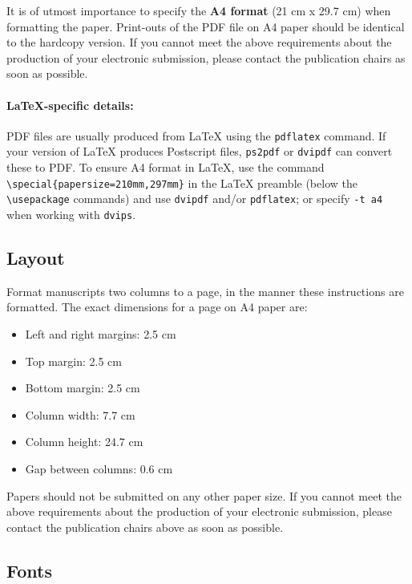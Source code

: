 \documentclass[11pt,a4paper]{article}
\begin{document}
It is of utmost importance to specify the \textbf{A4 format} (21 cm x 29.7 cm) when formatting the paper.
Print-outs of the PDF file on A4 paper should be identical to the hardcopy version.
If you cannot meet the above requirements about the production of your electronic submission, please contact the publication chairs as soon as possible.

\paragraph{\LaTeX-specific details:}
PDF files are usually produced from \LaTeX{} using the \texttt{\small pdflatex} command.
If your version of \LaTeX{} produces Postscript files, \texttt{\small ps2pdf} or \texttt{\small dvipdf} can convert these to PDF.
To ensure A4 format in \LaTeX, use the command {\small\verb|\special{papersize=210mm,297mm}|}
in the \LaTeX{} preamble (below the {\small\verb|\usepackage|} commands) and use \texttt{\small dvipdf} and/or \texttt{\small pdflatex}; or specify \texttt{\small -t a4} when working with \texttt{\small dvips}.

\subsection{Layout}
\label{ssec:layout}

Format manuscripts two columns to a page, in the manner these
instructions are formatted.
The exact dimensions for a page on A4 paper are:

\begin{itemize}
\item Left and right margins: 2.5 cm
\item Top margin: 2.5 cm
\item Bottom margin: 2.5 cm
\item Column width: 7.7 cm
\item Column height: 24.7 cm
\item Gap between columns: 0.6 cm
\end{itemize}

\noindent Papers should not be submitted on any other paper size.
If you cannot meet the above requirements about the production of your electronic submission, please contact the publication chairs above as soon as possible.

\subsection{Fonts}
\end{document}
